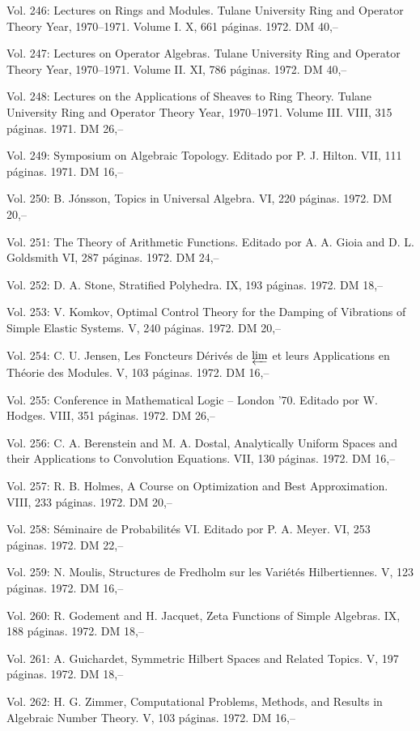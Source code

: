 Vol. 246: Lectures on Rings and Modules. Tulane University Ring and Operator Theory Year, 1970--1971. Volume I. X, 661 páginas. 1972. DM 40,--

Vol. 247: Lectures on Operator Algebras. Tulane University Ring and Operator Theory Year, 1970--1971. Volume II. XI, 786 páginas. 1972. DM 40,--

Vol. 248: Lectures on the Applications of Sheaves to Ring Theory. Tulane University Ring and Operator Theory Year, 1970--1971. Volume III. VIII, 315 páginas. 1971. DM 26,--

Vol. 249: Symposium on Algebraic Topology. Editado por P. J. Hilton. VII, 111 páginas. 1971. DM 16,--

Vol. 250: B. Jónsson, Topics in Universal Algebra. VI, 220 páginas. 1972. DM 20,--

Vol. 251: The Theory of Arithmetic Functions. Editado por A. A. Gioia and D. L. Goldsmith VI, 287 páginas. 1972. DM 24,--

Vol. 252: D. A. Stone, Stratified Polyhedra. IX, 193 páginas. 1972. DM 18,--

Vol. 253: V. Komkov, Optimal Control Theory for the Damping of Vibrations of Simple Elastic Systems. V, 240 páginas. 1972. DM 20,--

Vol. 254: C. U. Jensen, Les Foncteurs Dérivés de $\varprojlim$ et leurs Applications en Théorie des Modules. V, 103 páginas. 1972. DM 16,--

Vol. 255: Conference in Mathematical Logic -- London '70. Editado por W. Hodges. VIII, 351 páginas. 1972. DM 26,--

Vol. 256: C. A. Berenstein and M. A. Dostal, Analytically Uniform Spaces and their Applications to Convolution Equations. VII, 130 páginas. 1972. DM 16,--

Vol. 257: R. B. Holmes, A Course on Optimization and Best Approximation. VIII, 233 páginas. 1972. DM 20,--

Vol. 258: Séminaire de Probabilités VI. Editado por P. A. Meyer. VI, 253 páginas. 1972. DM 22,--

Vol. 259: N. Moulis, Structures de Fredholm sur les Variétés Hilbertiennes. V, 123 páginas. 1972. DM 16,--

Vol. 260: R. Godement and H. Jacquet, Zeta Functions of Simple Algebras. IX, 188 páginas. 1972. DM 18,--

Vol. 261: A. Guichardet, Symmetric Hilbert Spaces and Related Topics. V, 197 páginas. 1972. DM 18,--

Vol. 262: H. G. Zimmer, Computational Problems, Methods, and Results in Algebraic Number Theory. V, 103 páginas. 1972. DM 16,--

